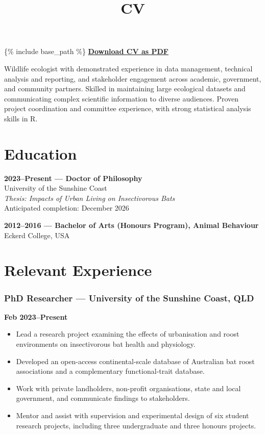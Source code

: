 \documentclass[
]{article}
\title{CV}
\author{}
\date{\vspace{-2.5em}}
\providecommand{\tightlist}{%
  \setlength{\itemsep}{0pt}\setlength{\parskip}{0pt}}
\begin{document}
\maketitle

\{\% include base\_path \%\}
\href{\%7B\%7B\%20base_path\%20\%7D\%7D/files/Rowland_CV.pdf}{\textbf{Download
CV as PDF}}

Wildlife ecologist with demonstrated experience in data management,
technical analysis and reporting, and stakeholder engagement across
academic, government, and community partners. Skilled in maintaining
large ecological datasets and communicating complex scientific
information to diverse audiences. Proven project coordination and
committee experience, with strong statistical analysis skills in R.

\section{Education}\label{education}

\textbf{2023--Present --- Doctor of Philosophy}\\
University of the Sunshine Coast\\
\emph{Thesis: Impacts of Urban Living on Insectivorous Bats}\\
Anticipated completion: December 2026

\textbf{2012--2016 --- Bachelor of Arts (Honours Program), Animal
Behaviour}\\
Eckerd College, USA

\section{Relevant Experience}\label{relevant-experience}

\subsubsection{PhD Researcher --- University of the Sunshine Coast,
QLD}\label{phd-researcher-university-of-the-sunshine-coast-qld}

\textbf{Feb 2023--Present}

\begin{itemize}
\tightlist
\item
  Lead a research project examining the effects of urbanisation and
  roost environments on insectivorous bat health and physiology.
\item
  Developed an open-access continental-scale database of Australian bat
  roost associations and a complementary functional-trait database.
\item
  Work with private landholders, non-profit organisations, state and
  local government, and communicate findings to stakeholders.
\item
  Mentor and assist with supervision and experimental design of six
  student research projects, including three undergraduate and three
  honours projects.
\end{itemize}
\end{document}
